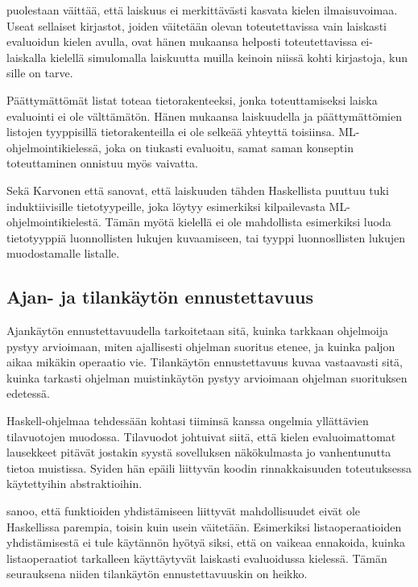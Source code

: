 \citet{vesakarvonen} puolestaan väittää, että laiskuus ei merkittävästi kasvata kielen ilmaisuvoimaa. Useat sellaiset kirjastot, joiden väitetään olevan toteutettavissa vain laiskasti evaluoidun kielen avulla, ovat hänen mukaansa helposti toteutettavissa ei-laiskalla kielellä simulomalla laiskuutta muilla keinoin niissä kohti kirjastoja, kun sille on tarve.

Päättymättömät listat \citet{pointoflaziness} toteaa tietorakenteeksi, jonka toteuttamiseksi laiska evaluointi ei ole välttämätön. Hänen mukaansa laiskuudella ja päättymättömien listojen tyyppisillä tietorakenteilla ei ole selkeää yhteyttä toisiinsa. ML-ohjelmointikielessä, joka on tiukasti evaluoitu, samat saman konseptin toteuttaminen onnistuu myös vaivatta.

Sekä Karvonen että \citet{pointoflaziness} sanovat, että laiskuuden tähden Haskellista puuttuu tuki induktiivisille tietotyypeille, joka löytyy esimerkiksi kilpailevasta ML-ohjelmointikielestä. Tämän myötä kielellä ei ole mahdollista esimerkiksi luoda tietotyyppiä luonnollisten lukujen kuvaamiseen, tai tyyppi luonnosllisten lukujen muodostamalle listalle.

\subsection{Ajan- ja tilankäytön ennustettavuus}

Ajankäytön ennustettavuudella tarkoitetaan sitä, kuinka tarkkaan ohjelmoija pystyy arvioimaan, miten ajallisesti ohjelman suoritus etenee, ja kuinka paljon aikaa mikäkin operaatio vie. Tilankäytön ennustettavuus kuvaa vastaavasti sitä, kuinka tarkasti ohjelman muistinkäytön pystyy arvioimaan ohjelman suorituksen edetessä.

Haskell-ohjelmaa tehdessään \citet{sampson2009experience} kohtasi tiiminsä kanssa ongelmia yllättävien tilavuotojen muodossa. Tilavuodot johtuivat siitä, että kielen evaluoimattomat lausekkeet pitävät jostakin syystä sovelluksen näkökulmasta jo vanhentunutta tietoa muistissa. Syiden hän epäili liittyvän koodin rinnakkaisuuden toteutuksessa käytettyihin abstraktioihin.

\citet{vesakarvonen} sanoo, että funktioiden yhdistämiseen liittyvät mahdollisuudet eivät ole Haskellissa parempia, toisin kuin usein väitetään. Esimerkiksi listaoperaatioiden yhdistämisestä ei tule käytännön hyötyä siksi, että on vaikeaa ennakoida, kuinka listaoperaatiot tarkalleen käyttäytyvät laiskasti evaluoidussa kielessä. Tämän seurauksena niiden tilankäytön ennustettavuuskin on heikko.


